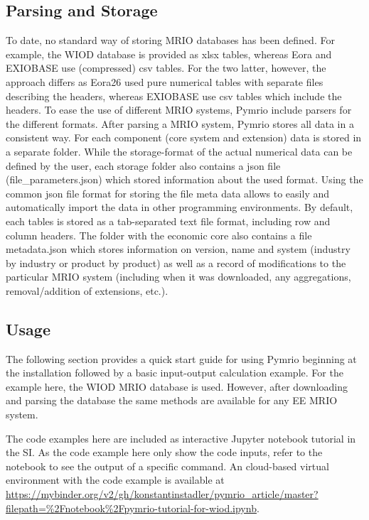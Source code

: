 \documentclass{jors}
\begin{document}
{\subsection*{Parsing and Storage}

To date, no standard way of storing MRIO databases has been defined.
For example, the WIOD database is provided as xlsx tables, whereas Eora and EXIOBASE use (compressed) csv tables.
For the two latter, however, the approach differs as Eora26 used pure numerical tables with separate files describing the headers, whereas EXIOBASE use csv tables which include the headers.
To ease the use of different MRIO systems, Pymrio include parsers for the different formats.
After parsing a MRIO system, Pymrio stores all data in a consistent way.
For each component (core system and extension) data is stored in a separate folder.
While the storage-format of the actual numerical data can be defined by the user, each storage folder also contains a json file (file\_parameters.json) which stored information about the used format. 
Using the common json file format for storing the file meta data  allows to easily and automatically import the data in other programming environments. 
By default, each tables is stored as a tab-separated text file format, including row and column headers.
The folder with the economic core also contains a file metadata.json which stores information on version, name and system (industry by industry or product by product) as well as a record of modifications to the particular MRIO system (including when it was downloaded, any aggregations, removal/addition of extensions, etc.). 

\subsection*{Usage}

The following section provides a quick start guide for using Pymrio beginning at the installation followed by a basic input-output calculation example.
For the example here, the WIOD MRIO database \cite{timmer2015} is used. 
However, after downloading and parsing the database the same methods are available for any EE MRIO system.

The code examples here are included as interactive Jupyter notebook tutorial in the SI.
As the code example here only show the code inputs, refer to the notebook to see the output of a specific command. 
An cloud-based virtual environment with the code example is available at \url{https://mybinder.org/v2/gh/konstantinstadler/pymrio_article/master?filepath=%2Fnotebook%2Fpymrio-tutorial-for-wiod.ipynb}.

}
\end{document}
